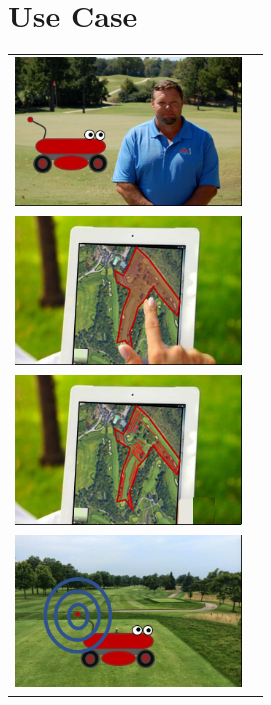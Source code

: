 \documentclass[12pt]{extarticle}
\begin{document}
\section{Use Case}
\begin{table}[H]
  \def\arraystretch{5}


\begin{tabular}{cl}
\includegraphics[width=6cm]{usecase1_1.png} \\
\includegraphics[width=6cm]{usecase1_2.png} \\
\includegraphics[width=6cm]{usecase1_3.png} \\
\includegraphics[width=6cm]{usecase1_4.png} \\
\end{tabular}
\end{table}
\end{document}
